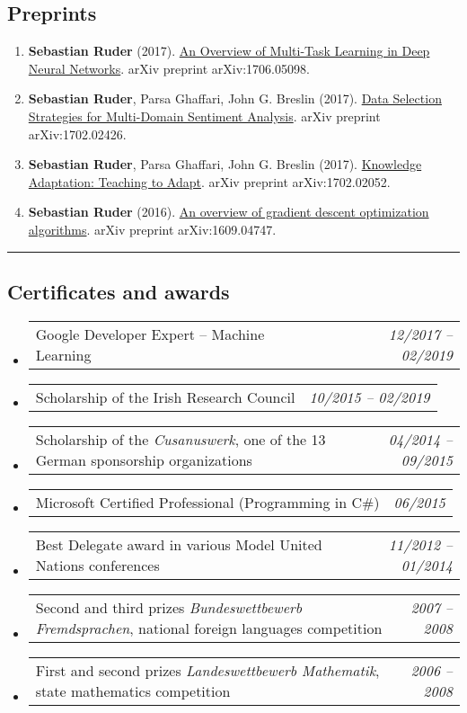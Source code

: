 \documentclass[10pt,letterpaper]{article}
\makeatletter
\newcommand{\headerrow}[2]
{\begin{tabular*}{\linewidth}{l@{\extracolsep{\fill}}r}
	#1 &
	#2 \\
\end{tabular*}}
\makeatother
\begin{document}
\subsection*{Preprints}
\begin{enumerate}
	\parskip=0.1em
	\setcounter{enumi}{16}
	
	\item \textbf{Sebastian Ruder} (2017). \href{https://arxiv.org/abs/1706.05098}{An Overview of Multi-Task Learning in Deep Neural Networks}. arXiv preprint arXiv:1706.05098.
	
	\item \textbf{Sebastian Ruder}, Parsa Ghaffari, John G. Breslin (2017). \href{https://arxiv.org/abs/1702.02426}{Data Selection Strategies for Multi-Domain Sentiment Analysis}. arXiv preprint arXiv:1702.02426.
	
	\item \textbf{Sebastian Ruder}, Parsa Ghaffari, John G. Breslin (2017). \href{https://arxiv.org/abs/1702.02052}{Knowledge Adaptation: Teaching to Adapt}. arXiv preprint arXiv:1702.02052.
	
	\item \textbf{Sebastian Ruder} (2016). \href{https://arxiv.org/pdf/1609.04747.pdf}{An overview of gradient descent optimization algorithms}. arXiv preprint arXiv:1609.04747.

\end{enumerate}


\hrule
\vspace{-0.4em}
\subsection*{Certificates and awards}

\begin{itemize}
	\parskip=0.1em
	
	\item 
	\headerrow
		{Google Developer Expert -- Machine Learning}
		{\emph{12/2017 -- 02/2019}}
	\item 
	\headerrow
		{Scholarship of the Irish Research Council}
		{\emph{10/2015 -- 02/2019}}
	\item 
	\headerrow
		{Scholarship of the \emph{Cusanuswerk}, one of the 13 German sponsorship organizations}
		{\emph{04/2014 -- 09/2015}}	
	\item 
	\headerrow
		{Microsoft Certified Professional (Programming in C\#)}
		{\emph{06/2015}}
	\item 
	\headerrow
		{Best Delegate award in various Model United Nations conferences}
		{\emph{11/2012 -- 01/2014}}
	\item 
	\headerrow
		{Second and third prizes \emph{Bundeswettbewerb Fremdsprachen}, national foreign languages competition}
		{\emph{2007 -- 2008}}
	\item 
	\headerrow
		{First and second prizes \emph{Landeswettbewerb Mathematik}, state mathematics competition}
		{\emph{2006 -- 2008}}
	

\end{itemize}
\end{document}
